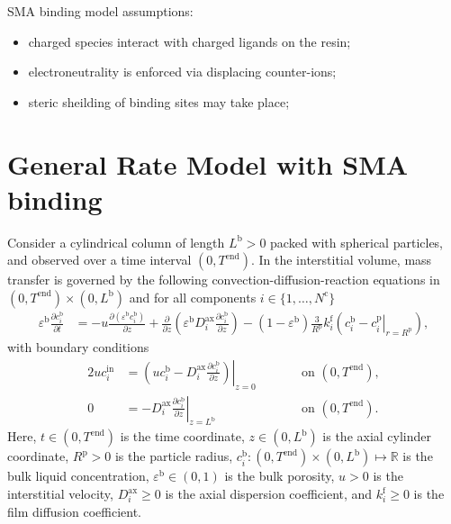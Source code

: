 \documentclass{article}
\begin{document}
SMA binding model assumptions:
\begin{itemize}
    \item charged species interact with charged ligands on the resin;
    \item electroneutrality is enforced via displacing counter-ions;
    \item steric sheilding of binding sites may take place;
\end{itemize}

\section*{General Rate Model with SMA binding}
Consider a cylindrical column of length $L^{\mathrm{b}} > 0$ packed with spherical particles, and observed over a time interval $(0, T^{\mathrm{end}})$.
In the interstitial volume, mass transfer is governed by the following convection-diffusion-reaction equations in $(0, T^{\mathrm{end}})\times (0, L^{\mathrm{b}})$ and for all components $i\in\{1, \dots, N^{\mathrm{c}} \}$
\begin{align}
    \varepsilon^{\mathrm{b}} \frac{\partial c^{\mathrm{b}}_{i}}{\partial t}
    &= - u \frac{\partial \left( \varepsilon^{\mathrm{b}} c^{\mathrm{b}}_{i} \right)}{\partial z}
        + \frac{\partial}{\partial z} \left( \varepsilon^{\mathrm{b}} D^{\mathrm{ax}}_{i} \frac{\partial c^{\mathrm{b}}_{i}}{\partial z} \right)
        - \left(1 - \varepsilon^{\mathrm{b}} \right) \frac{3}{R^{\mathrm{p}}} k^{\mathrm{f}}_{i} \left(c^{\mathrm{b}}_{i} - \left. c^{\mathrm{p}}_{i} \right|_{r = R^{\mathrm{p}}} \right),
\end{align}
with boundary conditions
\begin{alignat}{2}
    u c^{\mathrm{in}}_{i}
    &= \left.\left( u c^{\mathrm{b}}_{i} - D^{\mathrm{ax}}_{i} \frac{\partial c^{\mathrm{b}}_{i}}{\partial z}\right)\right|_{z=0}
    & & \qquad\text{on }(0, T^{\mathrm{end}}),
    \\
    0
    &= - D^{\mathrm{ax}}_{i} \left. \frac{\partial c^{\mathrm{b}}_{i}}{\partial z} \right|_{z=L^{\mathrm{b}}}
    & & \qquad\text{on }(0, T^{\mathrm{end}}).
\end{alignat}
Here, $t\in (0, T^{\mathrm{end}})$ is the time coordinate, $z\in (0, L^{\mathrm{b}})$ is the axial cylinder coordinate, $R^{\mathrm{p}}> 0$ is the particle radius, $c^{\mathrm{b}}_{i}\colon (0, T^{\mathrm{end}})\times (0, L^{\mathrm{b}}) \mapsto \mathbb{R}$ is the bulk liquid concentration, $\varepsilon^{\mathrm{b}}\in (0, 1)$ is the bulk porosity, $u> 0$ is the interstitial velocity, $D^{\mathrm{ax}}_{i}\geq 0$ is the axial dispersion coefficient, and $k^{\mathrm{f}}_{i}\geq 0$ is the film diffusion coefficient.
\end{document}
